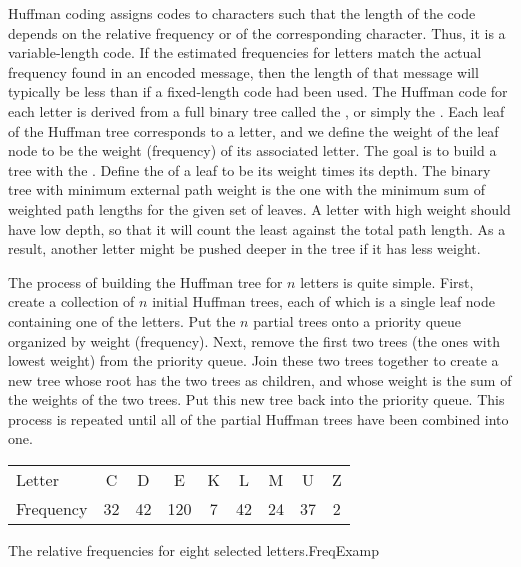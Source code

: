 Huffman coding assigns codes to characters such that the length of the
code depends on the relative frequency or  of the
corresponding character.
Thus, it is a variable-length code.
If the estimated frequencies for letters match
the actual frequency found in an encoded message, then the
length of that message will typically be less than if a fixed-length
code had been used.
The Huffman code for each letter is derived from a
full
binary tree called the , or simply the
.
Each leaf of the Huffman tree corresponds to a letter, and we define
the weight of the leaf node to be the weight (frequency) of its
associated letter.
The goal is to build a tree with the
.
Define the  of a leaf to be
its weight times its depth.
The binary tree with minimum external path weight is the one with the
minimum sum of weighted path lengths for the given set of leaves.
A letter with high weight should have low depth, so that it
will count the least against the total path length.
As a result, another letter might be pushed deeper in the tree if it has
less weight.

The process of building the Huffman tree for \(n\) letters is quite
simple.
First, create a collection of \(n\) initial Huffman trees, each of
which is a single leaf node containing one of the letters.
Put the \(n\) partial trees onto a
priority queue
organized by weight (frequency).
Next, remove the first two trees (the ones with lowest weight) from
the priority queue.
Join these two trees together to create a new tree whose root has the
two trees as children, and whose weight is the sum of the weights of
the two trees.
Put this new tree back into the priority queue.
This process is repeated until all of the partial Huffman trees have
been combined into one.

\begin{mytable}
\begin{center}
\begin{tabular}{|l|cccccccc|}
\hline
\rule{0pt}{11pt}Letter      &  C & D & E & K & L & M & U & Z\\
\rule{0pt}{11pt}Frequency   & 32 & 42 & 120 & 7 & 42 & 24 & 37 & 2\\
\hline
\end{tabular}
\end{center}
{The relative frequencies for eight selected letters.}{FreqExamp}
\end{mytable}

